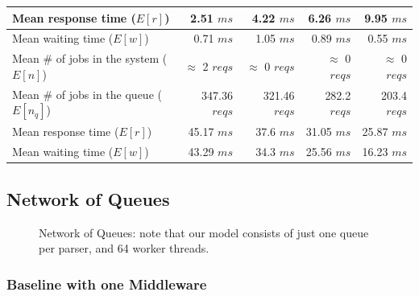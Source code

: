 \documentclass[11pt,a4paper]{article}
\begin{document}
\begin{table}[!h]
{{\begin{tabular}{|l|r|r|r|r|}
        \hline Mean response time ($E[r]$)                        & 2.51 ${ms}$      & 4.22 ${ms}$       & 6.26 ${ms}$      & 9.95 ${ms}$          \\
        \hline Mean waiting time ($E[w]$)                         & 0.71 ${ms}$      & 1.05 ${ms}$       & 0.89 ${ms}$      & 0.55 ${ms}$          \\
        \rowcolor{mygray}
        \hline Mean \# of jobs in the system ($E[n]$)             & $\approx$ 2 $reqs$ & $\approx$ 0 $reqs$ & $\approx$ 0 $reqs$ & $\approx$ 0 $reqs$  \\
        \rowcolor{mygray}
        \hline Mean \# of jobs in the queue ($E[n_q]$)            & 347.36 $reqs$      & 321.46 $reqs$      & 282.2 $reqs$       & 203.4 $reqs$        \\
        \rowcolor{mygray}
        \hline Mean response time ($E[r]$)                        & 45.17 $ms$         & 37.6 $ms$          & 31.05 $ms$         & 25.87 $ms$          \\
        \rowcolor{mygray}
        \hline Mean waiting time ($E[w]$)                         & 43.29 $ms$         & 34.3 $ms$          & 25.56 $ms$         & 16.23 $ms$          \\
        \hline
      \end{tabular}
    }
  }
\end{table}

\newpage
\subsection{Network of Queues}

\begin{figure}[!h]
  \centering
    \caption{Network of Queues: note that our model consists of just one queue per parser, and 64 worker threads.}
    \label{fig:queue_models_newtork}
\end{figure}

\subsubsection*{Baseline with one Middleware}
\end{document}
